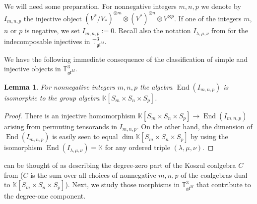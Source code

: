 \documentclass[11pt]{article}
\theoremstyle{plain}
\newtheorem{lemma}{Lemma}[section]
\newtheorem{corollary}[lemma]{Corollary}
\theoremstyle{nonumberplain}
\theoremstyle{plain}
\theoremstyle{nonumberplain}
\newtheorem{proof}{Proof}
\newcommand\bK{{\mathbb K}}
\newcommand\bT{{\mathbb T}}
\newcommand\fgl{\mathfrak{gl}}
\DeclareMathOperator{\End}{\mathrm{End}}
\DeclareMathOperator{\Hom}{\mathrm{Hom}}
\newcommand{\qedhere}{\mbox{}\hfill\ensuremath{\blacksquare}}
\begin{document}
We will need some preparation. For nonnegative integers $m,n,p$ we denote by $I_{m,n,p}$ the injective object $(V^*/V_*)^{\otimes m}\otimes (V^*)^{\otimes n}\otimes V^{\otimes p}$. If one of the integers $m$, $n$ or $p$ is negative, we set $I_{m,n,p}:=0$.  Recall also the notation $I_{\lambda,\mu,\nu}$ from  for the indecomposable injectives in $\bT^3_{\fgl^M}$. 


We have the following immediate consequence of the classification of simple and injective objects in $\bT^3_{\fgl^M}$. 



%
%
%
%
%
%





\begin{lemma}\label{le.0}
  For nonnegative integers $m,n,p$ the algebra $\End(I_{m,n,p})$ is isomorphic to the group algebra $\bK[S_m\times S_n\times S_p]$. 
\end{lemma}
\begin{proof}
There is an injective homomorphism $\bK[S_m\times S_n\times S_p]\to \End(I_{m,n,p})$ arising from permuting tensorands in $I_{m,n,p}$.  On the other hand, the dimension of $\End\left(I_{m,n,p}\right)$ is easily seen to equal $\dim \bK\left[S_m\times S_n\times S_p\right]$ by using the isomorphism $\End\left(I_{\lambda,\mu,\nu}\right)=\bK$ for any ordered triple $(\lambda,\mu,\nu)$.  %
\end{proof}


 can be thought of as describing the degree-zero part of the Koszul coalgebra $C$ from  ($C$ is the sum over all choices of nonnegative $m,n,p$ of the coalgebras dual to $\bK[S_m\times S_n\times S_p]$). Next, we study those morphisms in $\bT^3_{\fgl^M}$ that contribute to the degree-one component. 
\end{document}
